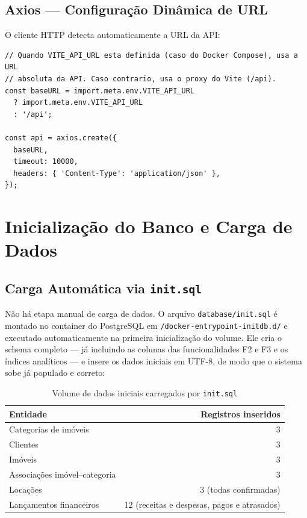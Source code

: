 \documentclass[12pt, a4paper]{article}
\newcommand{\thead}[1]{\cellcolor{tableheader}\color{white}\bfseries #1}
\newcommand{\talt}{\rowcolor{tablerowalt}}
\begin{document}
\subsection{Axios — Configuração Dinâmica de URL}

O cliente HTTP detecta automaticamente a URL da API:

\begin{lstlisting}[language={}]
// Quando VITE_API_URL esta definida (caso do Docker Compose), usa a URL
// absoluta da API. Caso contrario, usa o proxy do Vite (/api).
const baseURL = import.meta.env.VITE_API_URL
  ? import.meta.env.VITE_API_URL
  : '/api';

const api = axios.create({
  baseURL,
  timeout: 10000,
  headers: { 'Content-Type': 'application/json' },
});
\end{lstlisting}

\section{Inicialização do Banco e Carga de Dados}

\subsection{Carga Automática via \texttt{init.sql}}

Não há etapa manual de carga de dados. O arquivo \texttt{database/init.sql} é montado no container
do PostgreSQL em \texttt{/docker-entrypoint-initdb.d/} e executado automaticamente na primeira
inicialização do volume. Ele cria o schema completo — já incluindo as colunas das funcionalidades
F2 e F3 e os índices analíticos — e insere os dados iniciais em UTF-8, de modo que o sistema sobe
já populado e correto:

\begin{table}[H]
\centering
\begin{tabular}{|l|r|}
\hline
\thead{Entidade} & \thead{Registros inseridos} \\
\hline
Categorias de imóveis & 3 \\
\talt Clientes            & 3 \\
Imóveis               & 3 \\
\talt Associações imóvel--categoria & 3 \\
Locações              & 3 (todas confirmadas) \\
\talt Lançamentos financeiros & 12 (receitas e despesas, pagos e atrasados) \\
\hline
\end{tabular}
\caption{Volume de dados iniciais carregados por \texttt{init.sql}}
\end{table}
\end{document}

